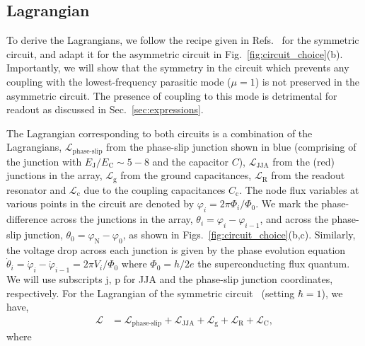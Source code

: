 \documentclass[%
reprint,
superscriptaddress,
 amsmath,amssymb,
 aps,
 prx,
longbibliography,
floatfix,
]{revtex4-2}
\begin{document}
\subsection{Lagrangian}

To derive the Lagrangians, we follow the recipe given in Refs.~\cite{viola2015collective,ferguson2013symmetries} for the symmetric circuit, and adapt it for the asymmetric circuit in Fig.~\ref{fig:circuit_choice}(b). Importantly, we will show that the symmetry in the circuit which prevents any coupling with the lowest-frequency parasitic mode ($\mu=1$) is not preserved in the asymmetric circuit. The presence of coupling to this mode is detrimental for readout as discussed in Sec.~\ref{sec:expressions}.


The Lagrangian corresponding to both circuits is a combination of the Lagrangians, $\mathcal{L}_\textrm{phase-slip}$ from the phase-slip junction shown in blue (comprising of the junction with $E_{\textrm{J}}/E_{\textrm{C}}\sim 5-8$ and the capacitor $C$), $\mathcal{L}_\textrm{JJA}$ from the (red) junctions in the array, $\mathcal{L}_\textrm{g}$ from the ground capacitances, $\mathcal{L}_\textrm{R}$ from the readout resonator and $\mathcal{L}_\textrm{c}$ due to the coupling capacitances $C_\textrm{c}$. The node flux variables at various points in the circuit are denoted by $\varphi_i=2\pi\Phi_i/\Phi_0$. We mark the phase-difference across the junctions in the array, $\theta_{i}=\varphi_i-\varphi_{i-1}$, and across the phase-slip junction, $\theta_0=\varphi_\textrm{N}-\varphi_{0}$, as shown in Figs.~\ref{fig:circuit_choice}(b,c). Similarly, the voltage drop across each junction is given by the phase evolution equation $\dot{\theta}_i=\dot{\varphi}_i-\dot{\varphi}_{i-1}=2\pi V_i/\Phi_0$ where $\Phi_0=h/2e$ the superconducting flux quantum. We will use subscripts $\textrm{j, p}$ for JJA and the phase-slip junction coordinates, respectively. For the Lagrangian of the symmetric circuit~\cite{viola2015collective,ferguson2013symmetries} (setting $\hbar=1$), we have, 
\begin{align}
    \mathcal{L}&=\mathcal{L}_{\textrm{phase-slip}}+\mathcal{L}_{\textrm{JJA}}+\mathcal{L}_{\textrm{g}}+\mathcal{L}_{\textrm{R}}+\mathcal{L}_{\textrm{C}},
\end{align}
where
\end{document}
